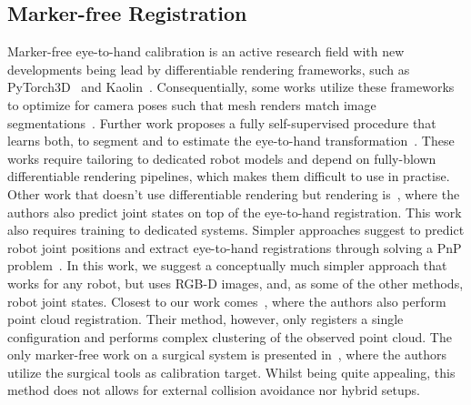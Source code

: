 \subsection{Marker-free Registration}
Marker-free eye-to-hand calibration is an active research field with new developments being lead by differentiable rendering frameworks, such as PyTorch3D~\cite{ravi2020pytorch3d} and Kaolin~\cite{KaolinLibrary}. Consequentially, some works utilize these frameworks to optimize for camera poses such that mesh renders match image segmentations~\cite{chen2023easyhec}. Further work proposes a fully self-supervised procedure that learns both, to segment and to estimate the eye-to-hand transformation~\cite{lu2023markerless}. These works require tailoring to dedicated robot models and depend on fully-blown differentiable rendering pipelines, which makes them difficult to use in practise. Other work that doesn't use differentiable rendering but rendering is~\cite{labbe2021single}, where the authors also predict joint states on top of the eye-to-hand registration. This work also requires training to dedicated systems. Simpler approaches suggest to predict robot joint positions and extract eye-to-hand registrations through solving a PnP problem~\cite{lee2020camera}. In this work, we suggest a conceptually much simpler approach that works for any robot, but uses RGB-D images, and, as some of the other methods, robot joint states. Closest to our work comes~\cite{point_cloud_based_robot_cell_calib}, where the authors also perform point cloud registration. Their method, however, only registers a single configuration and performs complex clustering of the observed point cloud. The only marker-free work on a surgical system is presented in~\cite{hand_eye_calibration_robotic_assisted}, where the authors utilize the surgical tools as calibration target. Whilst being quite appealing, this method does not allows for external collision avoidance nor hybrid setups.



